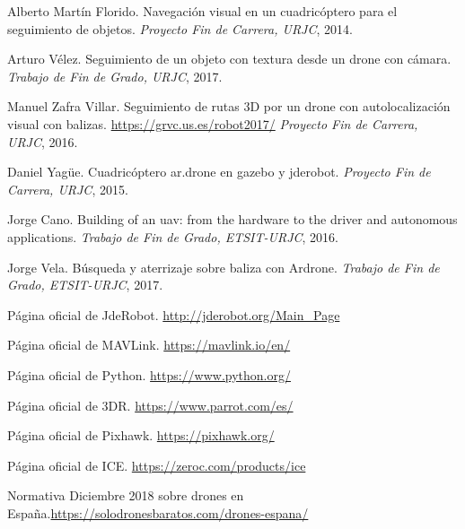 \begin{thebibliography}{1}


Alberto Martín Florido. Navegación visual en un cuadricóptero para el seguimiento de objetos. 
\textit{Proyecto Fin de Carrera, URJC}, 2014.

Arturo Vélez. Seguimiento de un objeto con textura desde un drone con cámara.
\textit{Trabajo de Fin de Grado, URJC}, 2017.

Manuel Zafra Villar. Seguimiento de rutas 3D por un drone con autolocalización visual con balizas. 
\url{https://grvc.us.es/robot2017/}
\textit{Proyecto Fin de Carrera, URJC}, 2016.

Daniel Yagüe. Cuadricóptero ar.drone en gazebo y jderobot. 
\textit{Proyecto Fin de Carrera, URJC}, 2015.

Jorge Cano. Building of an uav: from the hardware to the driver and autonomous applications. 
\textit{Trabajo de Fin de Grado, ETSIT-URJC}, 2016.

Jorge Vela. Búsqueda y aterrizaje sobre baliza con Ardrone.
\textit{Trabajo de Fin de Grado, ETSIT-URJC}, 2017.

Página oficial de JdeRobot. \url{http://jderobot.org/Main_Page}

Página oficial de MAVLink. \url{https://mavlink.io/en/}

Página oficial de Python. \url{https://www.python.org/}

Página oficial de 3DR. \url{https://www.parrot.com/es/}

Página oficial de Pixhawk. \url{https://pixhawk.org/}

Página oficial de ICE. \url{https://zeroc.com/products/ice}

Normativa Diciembre 2018 sobre drones en España.\url{https://solodronesbaratos.com/drones-espana/}

\end{thebibliography}